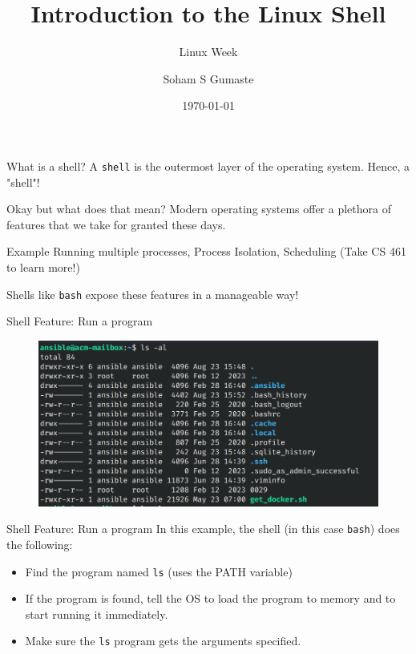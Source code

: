 \documentclass{beamer}
\title{Introduction to the Linux Shell}
\subtitle{Linux Week \the\year{}}
\author{Soham S Gumaste}
\date{\today}
\institute{Linux Users Group @ UIC}
\begin{document}
\begin{frame}
	\titlepage
\end{frame}

\begin{frame}{What is a shell?}
	A \texttt{shell} is the outermost layer of the operating system. Hence,
	a "shell"!
\end{frame}

\begin{frame}{Okay but what does that mean?}
	Modern operating systems offer a plethora of features that we take for
	granted these days.
	
	\pause

	\begin{exampleblock}{Example}
		Running multiple processes, Process Isolation, Scheduling (Take
		CS 461 to learn more!)
	\end{exampleblock}

	\pause

	Shells like \texttt{bash} expose these features in a manageable way!
\end{frame}

\begin{frame}{Shell Feature: Run a program}
	\begin{figure}
		\centering
		\includegraphics[width=\textwidth]{example.png}
	\end{figure}
\end{frame}

\begin{frame}{Shell Feature: Run a program}
	In this example, the shell (in this case \texttt{bash}) does the
	following:
	\pause
	\begin{itemize}
		\item Find the program named \texttt{ls} (uses the PATH variable)
			\pause
		\item If the program is found, tell the OS to load the program
			to memory and to start running it immediately.
			\pause
		\item Make sure the \texttt{ls} program gets the arguments
			specified.
	\end{itemize}
\end{frame}
\end{document}
